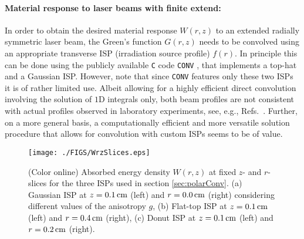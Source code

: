 \documentclass[12pt]{iopart}
\begin{document}
\paragraph{Material response to laser beams with finite extend:}
In order to obtain the desired material response $W(r,z)$ to an extended
radially symmetric laser beam, the Green's function $G(r,z)$ needs to be
convolved using an appropriate transverse ISP (irradiation source profile)
$f(r)$.  
In principle this can be done using the publicly available {\tt C} 
code {\tt CONV} \cite{CONV:1997}, that implements a top-hat and a Gaussian ISP.  
However, note that since {\tt CONV} features only these two ISPs it is of 
rather limited use. Albeit allowing for a highly efficient direct convolution
involving the solution of $1$D integrals only, both beam profiles are not
consistent with actual profiles observed in laboratory experiments, see, e.g.,
Refs.~\cite{Paltauf:1997, Paltauf:1998, Paltauf:2000, DAlessandro:2012,
Blumenroether:2016}.  
Further, on a more general basis, a computationally efficient and more
versatile solution procedure that allows for convolution with custom ISPs seems
to be of value.

%
%
\begin{figure}[t!]
\centerline{\texttt{[image: ./FIGS/WrzSlices.eps]} } 
\caption{(Color online) Absorbed energy density $W(r,z)$ at fixed $z$- and 
$r$-slices for the three ISPs used in section \ref{sec:polarConv}.
(a) Gaussian ISP at $z=0.1\,{\rm{cm}}$ (left) and 
$r=0.0\,{\rm{cm}}$ (right) considering different values of the anisotropy $g$,
(b) Flat-top ISP at $z=0.1\,{\rm{cm}}$ (left) and 
$r=0.4\,{\rm{cm}}$ (right),
(c) Donut ISP at $z=0.1\,{\rm{cm}}$ (left) and 
$r=0.2\,{\rm{cm}}$ (right).
}
\label{fig:WSlices}
\end{figure}
\end{document}
